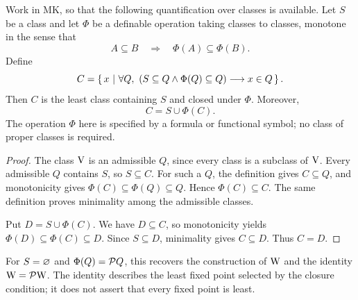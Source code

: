 \begin{theorem}
Work in MK, so that the following quantification over classes is available.
Let $S$ be a class and let $\Phi$ be a definable operation taking classes
to classes, monotone in the sense that
\[
A\subseteq B\quad\Longrightarrow\quad\Phi(A)\subseteq\Phi(B).
\]
Define
\[
C=\left\{\,x\ \middle|\ \forall Q,\
 (S\subseteq Q\land\Phi(Q)\subseteq Q)\longrightarrow x\in Q\,\right\}.
\]
Then $C$ is the least class containing $S$ and closed under $\Phi$.
Moreover,
\[
C=S\cup\Phi(C).
\]
The operation $\Phi$ here is specified by a formula or functional symbol;
no class of proper classes is required.
\end{theorem}
\begin{proof}
The class $\mathrm{V}$ is an admissible $Q$, since every class is a subclass of
$\mathrm{V}$. Every admissible $Q$ contains $S$, so $S\subseteq C$. For such
a $Q$, the definition gives $C\subseteq Q$, and monotonicity gives
$\Phi(C)\subseteq\Phi(Q)\subseteq Q$. Hence $\Phi(C)\subseteq C$.
The same definition proves minimality among the admissible classes.

Put $D=S\cup\Phi(C)$. We have $D\subseteq C$, so monotonicity yields
$\Phi(D)\subseteq\Phi(C)\subseteq D$. Since $S\subseteq D$, minimality
gives $C\subseteq D$. Thus $C=D$.
\end{proof}

For $S=\varnothing$ and $\Phi(Q)=\mathcal{P} Q$, this recovers the
construction of $\mathrm{W}$ and the identity $\mathrm{W}=\mathcal{P}\mathrm{W}$. The identity
describes the least fixed point selected by the closure condition; it
does not assert that every fixed point is least.

